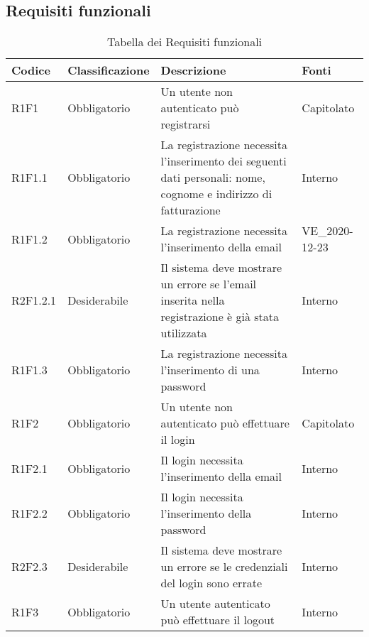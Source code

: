 \subsection{Requisiti funzionali} 


{


\centering
\renewcommand{\arraystretch}{2}
\begin{longtable}{C{2.5cm} C{2.8cm} C{6.7cm} C{2.5cm}}
\caption{Tabella dei Requisiti funzionali}\\
\textbf{Codice} &
\textbf{Classificazione}&
\textbf{Descrizione}&
\textbf{Fonti}\\
\endhead


R1F1 & Obbligatorio & Un utente non autenticato può registrarsi & Capitolato \\
R1F1.1 & Obbligatorio & La registrazione necessita l'inserimento dei seguenti dati personali: nome, cognome e indirizzo di fatturazione & Interno \\
R1F1.2 & Obbligatorio & La registrazione necessita l'inserimento della email & VE\_2020-12-23 \\
R2F1.2.1 & Desiderabile & Il sistema deve mostrare un errore se l'email inserita nella registrazione è già stata utilizzata & Interno \\
R1F1.3 & Obbligatorio & La registrazione necessita l'inserimento di una password & Interno \\


R1F2 & Obbligatorio & Un utente non autenticato può effettuare il login & Capitolato \\
R1F2.1 & Obbligatorio & Il login necessita l'inserimento della email & Interno \\
R1F2.2 & Obbligatorio & Il login necessita l'inserimento della password & Interno \\
R2F2.3 & Desiderabile & Il sistema deve mostrare un errore se le credenziali del login sono errate & Interno \\


R1F3 & Obbligatorio & Un utente autenticato può effettuare il logout & Interno \\



\end{longtable}}
